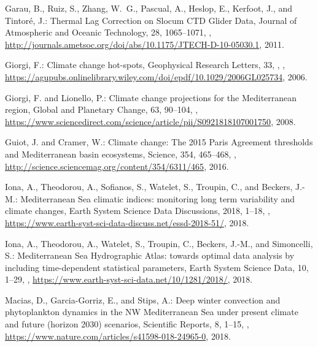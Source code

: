 \documentclass[essd]{copernicus}
\begin{document}
\begin{thebibliography}{46}
Garau, B., Ruiz, S., Zhang, W.~G., Pascual, A., Heslop, E., Kerfoot, J., and
  Tintor\'{e}, J.: Thermal Lag Correction on Slocum {CTD} Glider Data, Journal
  of Atmospheric and Oceanic Technology, 28, 1065--1071,
  ,
  \urlprefix\url{http://journals.ametsoc.org/doi/abs/10.1175/JTECH-D-10-05030.1},
  2011.

Giorgi, F.: Climate change hot-spots, Geophysical Research Letters, 33, {},
  ,
  \urlprefix\url{https://agupubs.onlinelibrary.wiley.com/doi/epdf/10.1029/2006GL025734},
  2006.

Giorgi, F. and Lionello, P.: Climate change projections for the Mediterranean
  region, Global and Planetary Change, 63, 90–104,
  ,
  \urlprefix\url{https://www.sciencedirect.com/science/article/pii/S0921818107001750},
  2008.

Guiot, J. and Cramer, W.: {Climate change: The 2015 Paris Agreement thresholds
  and Mediterranean basin ecosystems}, Science, 354, 465–468,
  ,
  \urlprefix\url{http://science.sciencemag.org/content/354/6311/465}, 2016.

Iona, A., Theodorou, A., Sofianos, S., Watelet, S., Troupin, C., and Beckers,
  J.-M.: {Mediterranean Sea climatic indices: monitoring long term variability
  and climate changes}, {Earth System Science Data Discussions}, 2018, 1--18,
  ,
  \urlprefix\url{https://www.earth-syst-sci-data-discuss.net/essd-2018-51/},
  2018{}.

Iona, A., Theodorou, A., Watelet, S., Troupin, C., Beckers, J.-M., and
  Simoncelli, S.: {Mediterranean Sea Hydrographic Atlas: towards optimal data
  analysis by including time-dependent statistical parameters}, {Earth System
  Science Data}, 10, 1--29, ,
  \urlprefix\url{https://www.earth-syst-sci-data.net/10/1281/2018/},
  2018{}.

Macias, D., Garcia-Gorriz, E., and Stips, A.: {Deep winter convection and
  phytoplankton dynamics in the NW Mediterranean Sea under present climate and
  future (horizon 2030) scenarios}, Scientific Reports, 8, 1--15,
  ,
  \urlprefix\url{https://www.nature.com/articles/s41598-018-24965-0}, 2018.


\end{thebibliography}
\end{document}
